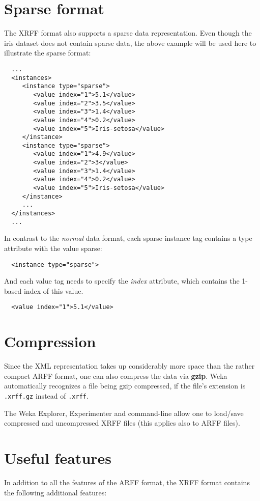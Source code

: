 \section{Sparse format}
The XRFF format also supports a sparse data representation. Even though the iris dataset does not contain sparse data, the above example will be used here to illustrate the sparse format:

\begin{verbatim}
  ...
  <instances>
     <instance type="sparse">
        <value index="1">5.1</value>
        <value index="2">3.5</value>
        <value index="3">1.4</value>
        <value index="4">0.2</value>
        <value index="5">Iris-setosa</value>
     </instance>
     <instance type="sparse">
        <value index="1">4.9</value>
        <value index="2">3</value>
        <value index="3">1.4</value>
        <value index="4">0.2</value>
        <value index="5">Iris-setosa</value>
     </instance>
     ...
  </instances>
  ...
\end{verbatim}

\noindent In contrast to the \textit{normal} data format, each sparse instance tag contains a type attribute with the value sparse:

\begin{verbatim}
  <instance type="sparse">
\end{verbatim}

\noindent And each value tag needs to specify the \textit{index} attribute, which contains the 1-based index of this value.

\begin{verbatim}
  <value index="1">5.1</value>
\end{verbatim}

\section{Compression}
Since the XML representation takes up considerably more space than the rather compact ARFF format, one can also compress the data via \textbf{gzip}. Weka automatically recognizes a file being gzip compressed, if the file's extension is \texttt{.xrff.gz} instead of \texttt{.xrff}.

The Weka Explorer, Experimenter and command-line allow one to load/save compressed and uncompressed XRFF files (this applies also to ARFF files).

\section{Useful features}
In addition to all the features of the ARFF format, the XRFF format contains the following additional features:

